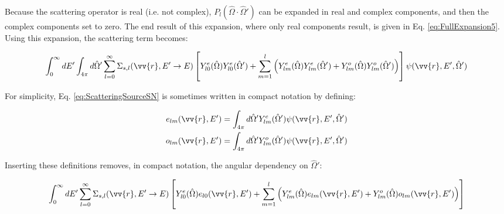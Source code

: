 \documentclass[10pt]{article}
\begin{document}
\begin{flushleft}
Because the scattering operator is real (i.e. not complex), \(P_l(\hat{\Omega}\cdot\hat{\Omega}')\) can be expanded in real and complex components, and then the complex components set to zero. The end result of this expansion, where only real components result, is given in Eq. \eqref{eq:FullExpansion5}. Using this expansion, the scattering term becomes:

\begin{equation}
\label{eq:ScatteringSourceSN}
\begin{aligned}
\int_{0}^{\infty}dE' \int_{4\pi}^{ } d\hat{\Omega}' \sum_{l=0}^{\infty}\Sigma_{s,l}(\vv{r}, E'\rightarrow E)\left\lbrack Y_{l0}^e(\hat{\Omega})Y_{l0}^e(\hat{\Omega}')+\sum_{m=1}^{l}\left(Y_{lm}^e(\hat{\Omega})Y_{lm}^{e}(\hat{\Omega}')+Y_{lm}^o(\hat{\Omega})Y_{lm}^{o}(\hat{\Omega}')\right)\right\rbrack\psi(\vv{r}, E', \hat{\Omega}')\\
\end{aligned}
\end{equation}

\begin{tcolorbox}[breakable]
For simplicity, Eq. \eqref{eq:ScatteringSourceSN} is sometimes written in compact notation by defining:

\begin{equation}
\label{eq:FluxMoments31}
\begin{aligned}
e_{lm}(\vv{r},E')=\int_{4\pi}^{}d\hat{\Omega}'Y_{lm}^e(\hat{\Omega}')\psi(\vv{r}, E',\hat{\Omega}')\\
o_{lm}(\vv{r},E')=\int_{4\pi}^{}d\hat{\Omega}'Y_{lm}^o(\hat{\Omega}')\psi(\vv{r}, E',\hat{\Omega}')\\
\end{aligned}
\end{equation}

Inserting these definitions removes, in compact notation, the angular dependency on \(\hat{\Omega}'\):

\begin{equation}
\label{eq:ScatteringSourceSNSimple}
\begin{aligned}
\int_{0}^{\infty}dE' \sum_{l=0}^{\infty}\Sigma_{s,l}(\vv{r}, E'\rightarrow E)\left\lbrack Y_{l0}^e(\hat{\Omega})e_{l0}(\vv{r},E')+\sum_{m=1}^{l}\left(Y_{lm}^e(\hat{\Omega})e_{lm}(\vv{r},E')+Y_{lm}^o(\hat{\Omega})o_{lm}(\vv{r},E')\right)\right\rbrack\\
\end{aligned}
\end{equation}
\end{tcolorbox}


\end{flushleft}
\end{document}
